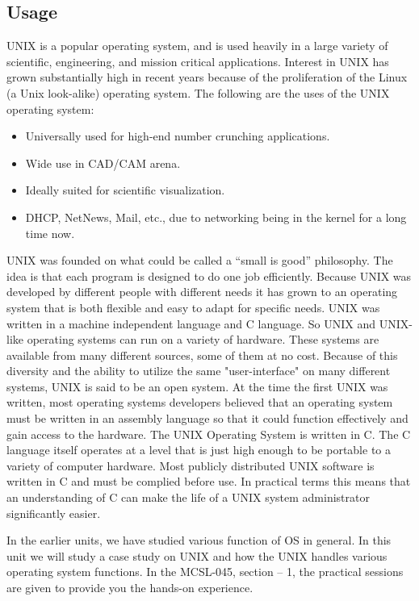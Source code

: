 \documentclass{article}
\begin{document}
\subsection{Usage} UNIX is a popular operating system, and is used heavily in a large variety of scientific, engineering, and mission critical applications. Interest in UNIX has grown substantially high in recent years because of the proliferation of the Linux (a Unix look-alike) operating system. The following are the uses of the UNIX operating system:
\begin{itemize}
  \item Universally used for high-end number crunching applications.
  \item Wide use in CAD/CAM arena.
  \item Ideally suited for scientific visualization.
  \item DHCP, NetNews, Mail, etc., due to networking being in the kernel for a long
time now.
\end{itemize}
UNIX was founded on what could be called a “small is good” philosophy. The idea is that each program is designed to do one job efficiently. Because UNIX was developed by different people with different needs it has grown to an operating system that is both flexible and easy to adapt for specific needs. UNIX was written in a machine independent language and C language. So UNIX and UNIX-like operating systems can run on a variety of hardware. These systems are available from many different sources, some of them at no cost. Because of this diversity and the ability to utilize the same "user-interface" on many different systems, UNIX is said to be an open system. At the time the first UNIX was written, most operating systems developers believed that an operating system must be written in an assembly language so that it could function effectively and gain access to the hardware. The UNIX Operating System is written in C. The C language itself operates at a level that is just high enough to be portable to a variety of computer hardware. Most publicly distributed UNIX software is written in C and must be complied before use. In practical terms this means that an understanding of C can make the life of a UNIX system administrator significantly easier.

In the earlier units, we have studied various function of OS in general. In this unit we
will study a case study on UNIX and how the UNIX handles various operating system
functions. In the MCSL-045, section – 1, the practical sessions are given to provide
you the hands-on experience.
\end{document}
